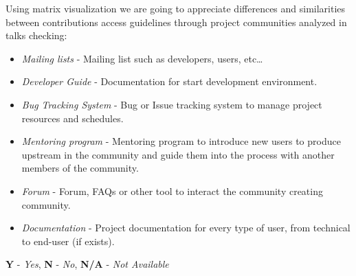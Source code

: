 \documentclass[11pt]{scrartcl}
\begin{document}
\par Using matrix visualization we are going to appreciate differences and similarities between contributions access guidelines through project communities analyzed in talks checking:

\begin{itemize}
	\item \emph{Mailing lists} -  Mailing list such as developers, users, etc\ldots
	\item \emph{Developer Guide} - Documentation for start development environment.
	\item \emph{Bug Tracking System} - Bug or Issue tracking system to manage project resources and schedules.
	\item \emph{Mentoring program} - Mentoring program to introduce new users to produce upstream in the community and guide them into the process with another members of the community.
	\item \emph{Forum} - Forum, FAQs or other tool to interact the community creating community.
	\item \emph{Documentation} - Project documentation for every type of user, from technical to end-user (if exists).
\end{itemize}

\begin{center}
    \textbf{Y} - \emph{Yes}, \textbf{N} - \emph{No}, \textbf{N/A} - \emph{Not Available}
\end{center}
\end{document}
